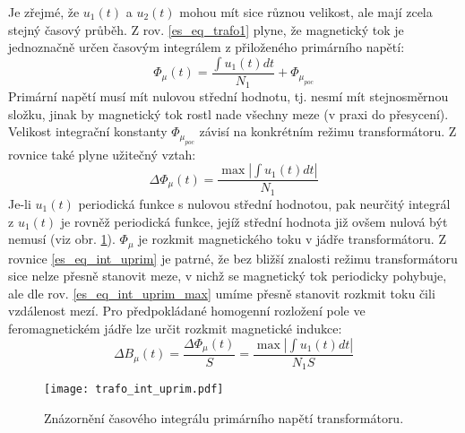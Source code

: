 {      Je zřejmé, že $u_1(t)$ a  $u_2(t)$ mohou mít sice různou velikost, ale mají zcela stejný 
      časový průběh. Z rov. \ref{es_eq_trafo1} plyne, že magnetický tok je jednoznačně určen 
      časovým integrálem z přiloženého primárního napětí:
      \begin{equation}\label{es_eq_int_uprim}
          \Phi_\mu(t)=\frac{\int u_1(t)dt}{N_1}+\Phi_{\mu_{poc}}
      \end{equation}
      Primární napětí musí mít nulovou střední hodnotu, tj. nesmí mít stejnosměrnou složku, jinak 
      by magnetický tok rostl nade všechny meze (v praxi do přesycení). Velikost integrační 
      konstanty $\Phi_{\mu_{poc}}$ závisí na konkrétním režimu transformátoru. Z rovnice také plyne 
      užitečný vztah:
      \begin{equation}\label{es_eq_int_uprim_max}
          \Delta\Phi_\mu(t)=\frac{\max|\int u_1(t)dt|}{N_1}
      \end{equation}
      Je-li $u_1(t)$ periodická funkce s nulovou střední hodnotou, pak neurčitý integrál z $u_1(t)$
      je rovněž periodická funkce, jejíž střední hodnota již ovšem nulová být nemusí (viz obr.
      \ref{es:fig_trafo_int_uprim}). $\Phi_\mu$ je rozkmit magnetického toku v jádře transformátoru.
      Z rovnice \ref{es_eq_int_uprim} je patrné, že bez bližší znalosti režimu transformátoru sice 
      nelze přesně stanovit meze, v nichž se magnetický tok periodicky pohybuje, ale dle rov.       
      \ref{es_eq_int_uprim_max} umíme přesně stanovit rozkmit toku čili vzdálenost mezí. Pro 
      předpokládané homogenní rozložení pole ve feromagnetickém jádře lze určit rozkmit magnetické 
      indukce:
      \begin{equation}\label{es_eq_rozkmit_B}
        \Delta B_\mu(t)=\frac{\Delta\Phi_\mu(t)}{S}=\frac{\max|\int u_1(t)dt|}{N_1S}
      \end{equation}

      \begin{figure}[ht!]
        \centering
        \texttt{[image: trafo\_int\_uprim.pdf]}
        \caption{Znázornění časového integrálu primárního napětí transformátoru.}
        \label{es:fig_trafo_int_uprim}
      \end{figure}

}

